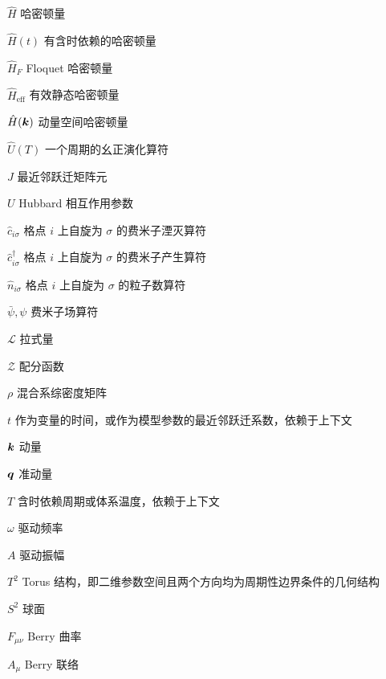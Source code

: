 \begin{denotation}[3cm]
\item[$\hat{H}$] 哈密顿量
\item[$\hat{H}(t)$] 有含时依赖的哈密顿量
\item[$\hat{H}_F$] Floquet 哈密顿量
\item[$\hat{H}_{\text{eff}}$] 有效静态哈密顿量
\item[$\hat{H}(\boldsymbol{k})$] 动量空间哈密顿量
\item[$\hat{U}(T)$] 一个周期的幺正演化算符
\item[$J$] 最近邻跃迁矩阵元
\item[$U$] Hubbard 相互作用参数
\item[$\hat{c}_{i\sigma}$] 格点 $i$ 上自旋为 $\sigma$ 的费米子湮灭算符
\item[$\hat{c}^{\dagger}_{i\sigma}$] 格点 $i$ 上自旋为 $\sigma$ 的费米子产生算符
\item[$\hat{n}_{i\sigma}$] 格点 $i$ 上自旋为 $\sigma$ 的粒子数算符
\item[$\bar\psi, \psi$] 费米子场算符
\item[$\mathcal{L}$] 拉式量
\item[$\mathcal{Z}$] 配分函数
\item[$\rho$] 混合系综密度矩阵
\item[$t$] 作为变量的时间，或作为模型参数的最近邻跃迁系数，依赖于上下文
\item[$\boldsymbol{k}$] 动量
\item[$\boldsymbol{q}$] 准动量
\item[$T$] 含时依赖周期或体系温度，依赖于上下文
\item[$\omega$] 驱动频率
\item[$A$] 驱动振幅
\item[$T^2$] Torus 结构，即二维参数空间且两个方向均为周期性边界条件的几何结构
\item[$S^2$] 球面
\item[$F_{\mu\nu}$] Berry 曲率
\item[$A_{\mu}$] Berry 联络
\end{denotation}





